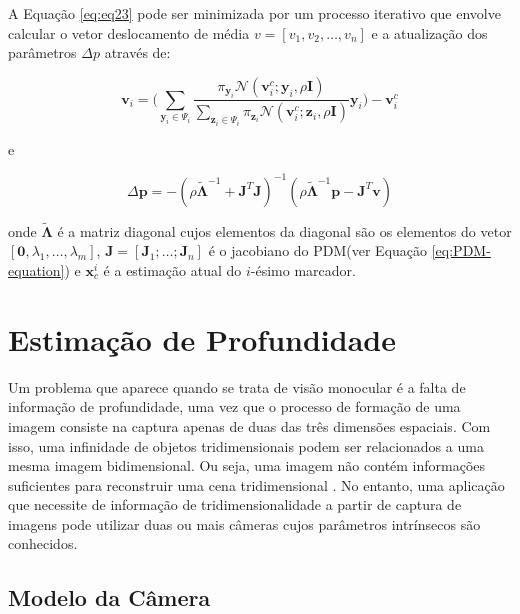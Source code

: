 {A Equação \ref{eq:eq23} pode ser minimizada por um processo iterativo que
envolve calcular o vetor deslocamento de média $v = [v_1, v_2, \ldots, v_n]$ e a
atualização dos parâmetros $\Delta p$ através de:

\begin{equation}
\textbf{v}_i = \Bigg(\sum\limits_{\textbf{y}_i \in \Psi_i} \frac{\pi_{\textbf{y}_i}\mathcal{N}(\textbf{v}_i^c;\textbf{y}_i,\rho\textbf{I})}{\sum\nolimits_{\textbf{z}_i \in \Psi_i} \pi_{\textbf{z}_i}\mathcal{N}(\textbf{v}_i^c;\textbf{z}_i,\rho\textbf{I})
}\textbf{y}_i\Bigg) - \textbf{v}_i^c
\label{eq:alg3}
\end{equation}

e

\begin{equation}
\Delta\textbf{p} = -(\rho\tilde{\mathbf{\Lambda}}^{-1} + \textbf{J}^T\textbf{J})^{-1}(\rho\tilde{\mathbf{\Lambda}}^{-1}\textbf{p} - \textbf{J}^T\textbf{v})
\label{eq:alg4}
\end{equation}

onde $\tilde{\mathbf{\Lambda}}$ é a matriz diagonal cujos elementos da diagonal
são os elementos do vetor $[\mathbf{0}, \lambda_1, \ldots, \lambda_m]$,
$\mathbf{J} = [\mathbf{J}_1; \ldots; \mathbf{J}_n]$ é o jacobiano do PDM(ver
Equação \ref{eq:PDM-equation}) e $\mathbf{x}_c^i$ é a estimação atual do
$i$-ésimo marcador.




               
\section{Estimação de Profundidade}

Um problema que aparece quando se trata de visão monocular é a falta de
informação de profundidade, uma vez que o processo de formação de uma imagem
consiste na captura apenas de duas das três dimensões espaciais. Com isso, uma
infinidade de objetos tridimensionais podem ser relacionados a uma mesma imagem
bidimensional. Ou seja, uma imagem não contém informações suficientes para
reconstruir uma cena tridimensional \cite{bolles1987epipolar}. No entanto, uma
aplicação que necessite de informação de tridimensionalidade a partir de captura
de imagens pode utilizar duas ou mais câmeras cujos parâmetros intrínsecos são
conhecidos.

\subsection{Modelo da Câmera}

}
